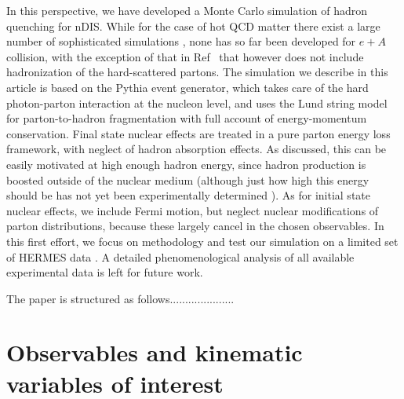 In this perspective, we have developed a Monte Carlo simulation of hadron 
quenching for nDIS. While for the case of hot QCD matter there exist a large 
number of sophisticated simulations \cite{some-review-of-hot-MCs,%
Buzzatti:2010ck}, none has so far been developed for $e+A$ collision, with 
the exception of that in Ref~\cite{Majumder:2009zu} that however does not 
include hadronization of the hard-scattered partons. The simulation we 
describe in this article is based on the Pythia event generator, which 
takes care of the hard photon-parton interaction at the nucleon level, and uses 
the Lund string model for parton-to-hadron fragmentation with full account of 
energy-momentum conservation. Final state nuclear effects are treated in a pure 
parton energy loss framework, with neglect of hadron absorption effects. As 
discussed, this can be easily motivated at high enough hadron energy, since 
hadron production is boosted outside of the nuclear medium (although just how 
high this energy should be has not yet been experimentally determined 
\cite{Accardi:2011mz}). As for initial state nuclear effects, we include Fermi 
motion, but neglect nuclear modifications of parton distributions, because 
these largely cancel in the chosen observables. In this first effort, we 
focus on methodology and test our simulation on a limited set of HERMES data
\cite{Airapetian:2011jp}. A detailed phenomenological analysis of all available 
experimental data is left for future work.

The paper is structured as follows.....................


\section{Observables and kinematic variables of interest}


